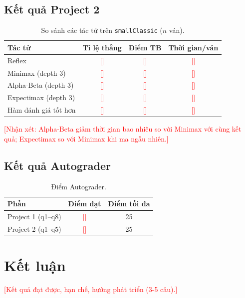 \documentclass[conference]{IEEEtran}
\newcommand{\todo}[1]{\textcolor{red}{[#1]}}
\begin{document}
\subsection{Kết quả Project 2}
\begin{table}[!ht]
    \centering
    \caption{So sánh các tác tử trên \texttt{smallClassic} ($n$ ván).}
    \label{tab:p2}
    \begin{tabular}{lccc}
    \toprule
    Tác tử & Tỉ lệ thắng & Điểm TB & Thời gian/ván \\
    \midrule
    Reflex & \todo{} & \todo{} & \todo{} \\
    Minimax (depth 3) & \todo{} & \todo{} & \todo{} \\
    Alpha-Beta (depth 3) & \todo{} & \todo{} & \todo{} \\
    Expectimax (depth 3) & \todo{} & \todo{} & \todo{} \\
    Hàm đánh giá tốt hơn & \todo{} & \todo{} & \todo{} \\
    \bottomrule
    \end{tabular}
\end{table}
\todo{Nhận xét: Alpha-Beta giảm thời gian bao nhiêu so với Minimax với cùng kết quả; Expectimax so với Minimax khi ma ngẫu nhiên.}

\subsection{Kết quả Autograder}
\begin{table}[!ht]
    \centering
    \caption{Điểm Autograder.}
    \label{tab:grader}
    \begin{tabular}{lcc}
    \toprule
    Phần & Điểm đạt & Điểm tối đa \\
    \midrule
    Project 1 (q1--q8) & \todo{} & 25 \\
    Project 2 (q1--q5) & \todo{} & 25 \\
    \bottomrule
    \end{tabular}
\end{table}

\section{Kết luận}
\todo{Kết quả đạt được, hạn chế, hướng phát triển (3-5 câu).}
\end{document}
